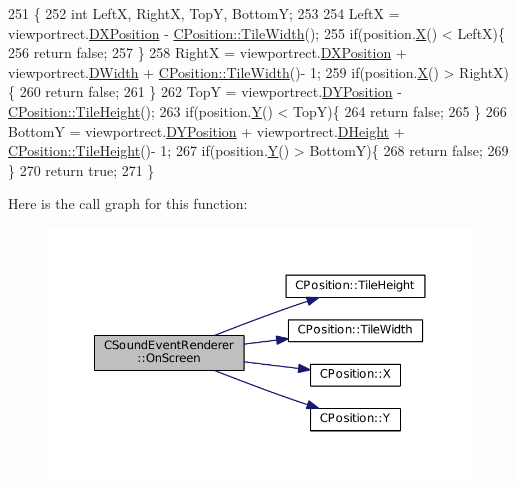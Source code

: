 \begin{DoxyCode}
251                                                                                            \{
252     \textcolor{keywordtype}{int} LeftX, RightX, TopY, BottomY;
253     
254     LeftX = viewportrect.\hyperlink{structSRectangle_abcbddb03b3ee416cc33109833b5f075c}{DXPosition} - \hyperlink{classCPosition_a27a7a8b9a5541da0aa8d97d785650fb8}{CPosition::TileWidth}();
255     \textcolor{keywordflow}{if}(position.\hyperlink{classCPosition_a9a6b94d3b91df1492d166d9964c865fc}{X}() < LeftX)\{
256         \textcolor{keywordflow}{return} \textcolor{keyword}{false};    
257     \}
258     RightX = viewportrect.\hyperlink{structSRectangle_abcbddb03b3ee416cc33109833b5f075c}{DXPosition} + viewportrect.\hyperlink{structSRectangle_a4150898b3f7d90f6e4b0d44bf1ae3bd2}{DWidth} + 
      \hyperlink{classCPosition_a27a7a8b9a5541da0aa8d97d785650fb8}{CPosition::TileWidth}()- 1;
259     \textcolor{keywordflow}{if}(position.\hyperlink{classCPosition_a9a6b94d3b91df1492d166d9964c865fc}{X}() > RightX)\{
260         \textcolor{keywordflow}{return} \textcolor{keyword}{false};    
261     \}
262     TopY = viewportrect.\hyperlink{structSRectangle_a120aa0a90033bc6e07c36c151a3bbc71}{DYPosition} - \hyperlink{classCPosition_ac4f0edd9c9632f1bdca981ef5d9b71e5}{CPosition::TileHeight}();
263     \textcolor{keywordflow}{if}(position.\hyperlink{classCPosition_a1aa8a30e2f08dda1f797736ba8c13a87}{Y}() < TopY)\{
264         \textcolor{keywordflow}{return} \textcolor{keyword}{false};    
265     \}
266     BottomY = viewportrect.\hyperlink{structSRectangle_a120aa0a90033bc6e07c36c151a3bbc71}{DYPosition} + viewportrect.\hyperlink{structSRectangle_a84ea3c2314c43cab6186170662188899}{DHeight} + 
      \hyperlink{classCPosition_ac4f0edd9c9632f1bdca981ef5d9b71e5}{CPosition::TileHeight}()- 1;
267     \textcolor{keywordflow}{if}(position.\hyperlink{classCPosition_a1aa8a30e2f08dda1f797736ba8c13a87}{Y}() > BottomY)\{
268         \textcolor{keywordflow}{return} \textcolor{keyword}{false};    
269     \}
270     \textcolor{keywordflow}{return} \textcolor{keyword}{true};
271 \}
\end{DoxyCode}
Here is the call graph for this function\+:\nopagebreak
\begin{figure}[H]
\begin{center}
\leavevmode
\includegraphics[width=350pt]{classCSoundEventRenderer_a9df97d476a3a39cb7126db9c366c2f0c_cgraph}
\end{center}
\end{figure}
